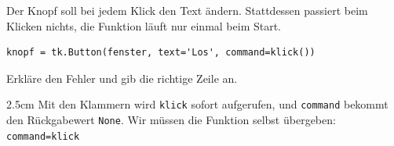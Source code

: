 \question[3]
Der Knopf soll bei jedem Klick den Text ändern. Stattdessen passiert beim Klicken nichts, die Funktion läuft nur einmal beim Start.
\begin{lstlisting}
knopf = tk.Button(fenster, text='Los', command=klick())
\end{lstlisting}
Erkläre den Fehler und gib die richtige Zeile an.
\begin{solutionbox}{2.5cm}
Mit den Klammern wird \texttt{klick} sofort aufgerufen, und \texttt{command} bekommt den Rückgabewert \texttt{None}. Wir müssen die Funktion selbst übergeben:
\texttt{command=klick}
\end{solutionbox}
